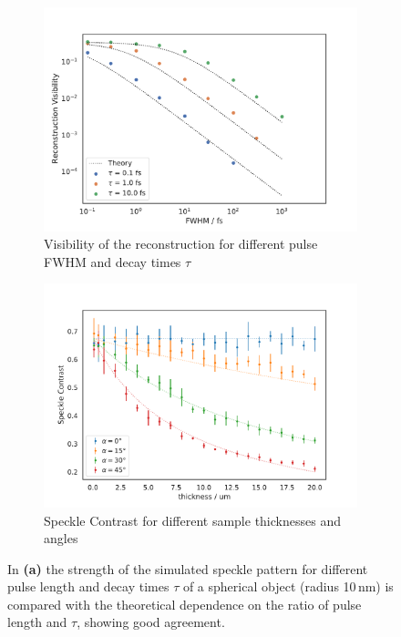\begin{figure}
\begin{subfigure}[b]{0.48\textwidth}
		\centering
		\includegraphics[width=\linewidth]{images/timedependent_2.pdf}
		\caption{Visibility of the reconstruction for different pulse FWHM and decay times $\tau$}
		\label{fig:tdpshere_visrecons}
	\end{subfigure}
	\hspace{0.1cm}
	\begin{subfigure}[b]{0.48\textwidth}
		\includegraphics[width=\linewidth]{images/thickness.pdf}
		\caption{Speckle Contrast for different sample thicknesses and angles}
		\label{fig:thickness}
	\end{subfigure}	
	\caption[Speckle strength and signal visibility in time dependent simulation]{ In \textbf{(a)} the strength of the simulated speckle pattern for different pulse length and decay times $\tau$ of a spherical object (radius 10\,nm) is compared with the theoretical dependence on the ratio of pulse length and $\tau$, showing good agreement. 
}
\end{figure}
